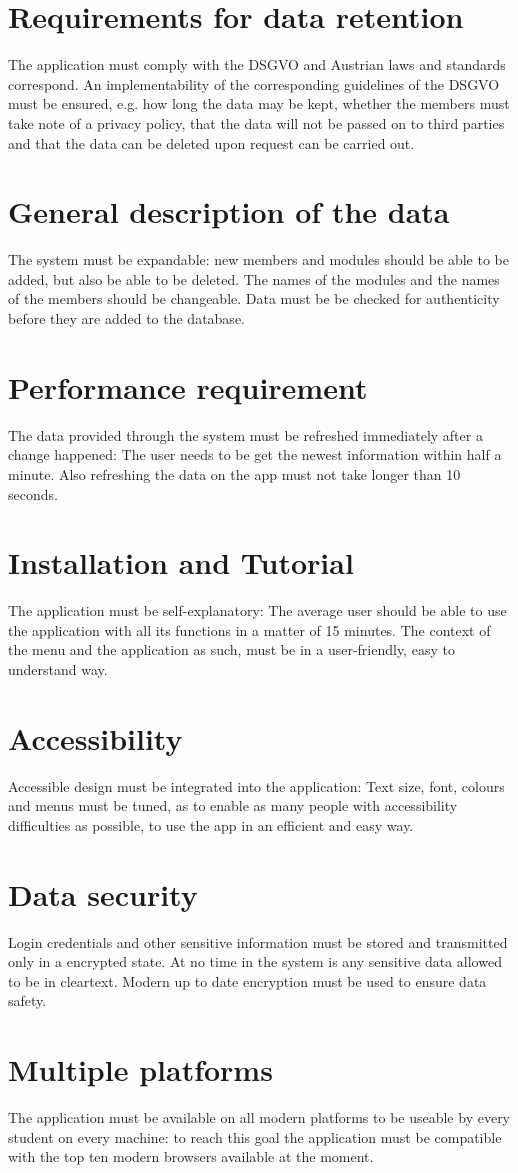 \documentclass{scrreprt}
\begin{document}
\section{Requirements for data retention}
The application must comply with the DSGVO and Austrian laws and standards
correspond. An implementability of the corresponding guidelines of the DSGVO must be ensured, e.g. how long the data may be kept, whether the members
must take note of a privacy policy, that the data will not be passed on to third parties and that the data can be deleted upon request can be carried out.

\section{General description of the data}
The system must be expandable: new members and modules should be able to
be added, but also be able to be deleted. The names
of the modules and the names of the members should be changeable. Data must be
be checked for authenticity before they are added to the database.

\section{Performance requirement}
The data provided through the system must be refreshed immediately after a change happened: The user needs to be get the newest information within half a minute. Also refreshing the data on the app must not take longer than 10 seconds.

\section{Installation and Tutorial}
The application must be self-explanatory: The average user should be able to use the application with all its functions in a matter of 15 minutes. The context of the menu and the application as such, must be in a user-friendly, easy to understand way.

\section{Accessibility}
Accessible design must be integrated into the application: Text size, font, colours and menus must be tuned, as to enable as many people with accessibility difficulties as possible, to use the app in an efficient and easy way.

\section{Data security}
Login credentials and other sensitive information must be stored and transmitted only in a encrypted state. At no time in the system is any sensitive data allowed to be in cleartext. Modern up to date encryption must be used to ensure data safety.

\section{Multiple platforms}
The application must be available on all modern platforms to be useable by every student on every machine: to reach this goal the application must be compatible with the top ten modern browsers available at the moment.
\end{document}
